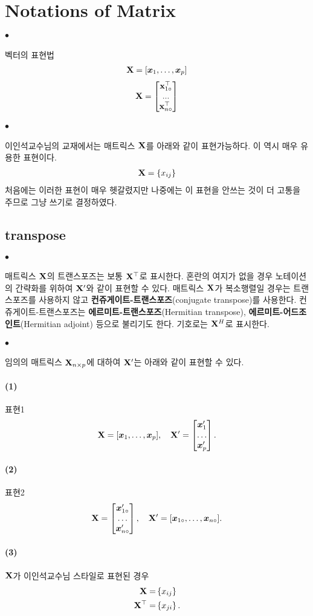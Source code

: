 \documentclass[12pt,oneside,english,a4paper]{article}
\def\ck{\paragraph{\Large$\bullet$}\Large}
\def\one{\paragraph{\Large(1)}\Large}
\def\two{\paragraph{\Large(2)}\Large}
\def\three{\paragraph{\Large(3)}\Large}
\newcommand{\bsx}{\mbox{\boldmath $x$}}
\begin{document}
\section{Notations of Matrix}

\ck 벡터의 표현법
\begin{align*}
{\bf X}=[\bsx_1,\dots,\bsx_p]
\end{align*}
\begin{align*}
{\bf X}=\begin{bmatrix} {\bf x}_{1\circ}^\top \\ ... \\ {\bf x}_{n\circ}^\top \end{bmatrix} 
\end{align*}

\ck 이인석교수님의 교재에서는 매트릭스 ${\bf X}$를 아래와 같이 표현가능하다. 이 역시 매우 유용한 표현이다. 
\begin{align*}
{\bf X}=\left\{x_{ij}\right\}
\end{align*}
처음에는 이러한 표현이 매우 헷갈렸지만 나중에는 이 표현을 안쓰는 것이 더 고통을 주므로 그냥 쓰기로 결정하였다. 

\subsection{transpose}

\ck 매트릭스 ${\bf X}$의 트랜스포즈는 보통 ${\bf X}^\top$로 표시한다. 혼란의 여지가 없을 경우 노테이션의 간략화를 위하여 ${\bf X}'$와 같이 표현할 수 있다. 매트릭스 ${\bf X}$가 복소행렬일 경우는 트랜스포즈를 사용하지 않고 \textbf{컨쥬게이트-트랜스포즈}(conjugate transpose)를 사용한다. 컨쥬게이트-트랜스포즈는 \textbf{에르미트-트랜스포즈}(Hermitian transpose), \textbf{에르미트-어드조인트}(Hermitian adjoint) 등으로 불리기도 한다. 기호로는 ${\bf X}^H$로 표시한다. 

\ck 임의의 매트릭스 ${\bf X}_ {n \times p}$에 대하여 ${\bf X}'$는 아래와 같이 표현할 수 있다.   
\one 표현1 
\begin{align*}
{\bf X}=[\bsx_1, \dots, \bsx_p], \quad 
{\bf X}'=\begin{bmatrix} \bsx_1' \\ \dots \\ \bsx_p' \end{bmatrix}.
\end{align*}
\two 표현2
\begin{align*}
{\bf X}=\begin{bmatrix}{\bsx}_{1\circ}' \\ \dots \\ \bsx_{n\circ}' \end{bmatrix}, \quad 
{\bf X}'=[\bsx_{1\circ}, \dots, \bsx_{n\circ}].
\end{align*}
\three ${\bf X}$가 이인석교수님 스타일로 표현된 경우
\begin{align*}
{\bf X}=&\left\{x_{ij}\right\} \\ 
{\bf X}^\top=&\left\{x_{ji}\right\}.
\end{align*}
\end{document}

